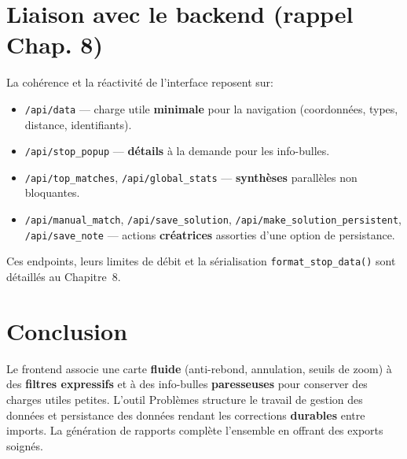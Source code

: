 \section{Liaison avec le backend (rappel Chap. 8)}

La cohérence et la réactivité de l'interface reposent sur:
\begin{itemize}
  \item \texttt{/api/data} — charge utile \textbf{minimale} pour la navigation (coordonnées, types, distance, identifiants).
  \item \texttt{/api/stop\_popup} — \textbf{détails} à la demande pour les info-bulles.
  \item \texttt{/api/top\_matches}, \texttt{/api/global\_stats} — \textbf{synthèses} parallèles non bloquantes.
  \item \texttt{/api/manual\_match}, \texttt{/api/save\_solution}, \texttt{/api/make\_solution\_persistent}, \texttt{/api/save\_note} — actions \textbf{créatrices} assorties d'une option de persistance.
\end{itemize}

Ces endpoints, leurs limites de débit et la sérialisation \texttt{format\_stop\_data()} sont détaillés au Chapitre~8.

\section*{Conclusion}

Le frontend associe une carte \textbf{fluide} (anti-rebond, annulation, seuils de zoom) à des \textbf{filtres expressifs} et à des info-bulles \textbf{paresseuses} pour conserver des charges utiles petites. L'outil Problèmes structure le travail de gestion des données et  persistance des données rendant les corrections \textbf{durables} entre imports. La génération de rapports complète l'ensemble en offrant des exports soignés.
